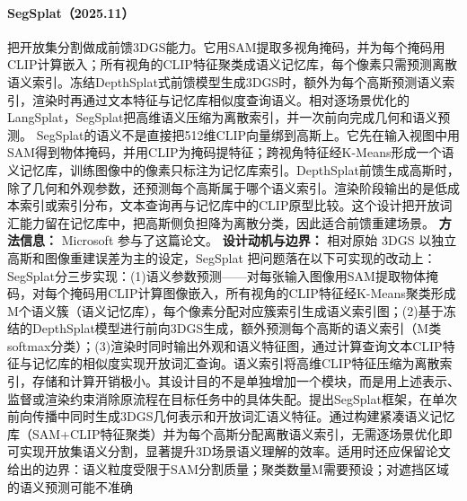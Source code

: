 \paragraph{SegSplat（2025.11）\cite{2511_18386}}
把开放集分割做成前馈3DGS能力。它用SAM提取多视角掩码，并为每个掩码用CLIP计算嵌入；所有视角的CLIP特征聚类成语义记忆库，每个像素只需预测离散语义索引。冻结DepthSplat式前馈模型生成3DGS时，额外为每个高斯预测语义索引，渲染时再通过文本特征与记忆库相似度查询语义。相对逐场景优化的LangSplat，SegSplat把高维语义压缩为离散索引，并一次前向完成几何和语义预测。
SegSplat的语义不是直接把512维CLIP向量绑到高斯上。它先在输入视图中用SAM得到物体掩码，并用CLIP为掩码提特征；跨视角特征经K-Means形成一个语义记忆库，训练图像中的像素只标注为记忆库索引。DepthSplat前馈生成高斯时，除了几何和外观参数，还预测每个高斯属于哪个语义索引。渲染阶段输出的是低成本索引或索引分布，文本查询再与记忆库中的CLIP原型比较。这个设计把开放词汇能力留在记忆库中，把高斯侧负担降为离散分类，因此适合前馈重建场景。
\textbf{方法信息：} Microsoft 参与了这篇论文。
\textbf{设计动机与边界：} 相对原始 3DGS 以独立高斯和图像重建误差为主的设定，SegSplat 把问题落在以下可实现的改动上：SegSplat分三步实现：(1)语义参数预测——对每张输入图像用SAM提取物体掩码，对每个掩码用CLIP计算图像嵌入，所有视角的CLIP特征经K-Means聚类形成M个语义簇（语义记忆库），每个像素分配对应簇索引生成语义索引图；(2)基于冻结的DepthSplat模型进行前向3DGS生成，额外预测每个高斯的语义索引（M类softmax分类）；(3)渲染时同时输出外观和语义特征图，通过计算查询文本CLIP特征与记忆库的相似度实现开放词汇查询。语义索引将高维CLIP特征压缩为离散索引，存储和计算开销极小。其设计目的不是单独增加一个模块，而是用上述表示、监督或渲染约束消除原流程在目标任务中的具体失配。提出SegSplat框架，在单次前向传播中同时生成3DGS几何表示和开放词汇语义特征。通过构建紧凑语义记忆库（SAM+CLIP特征聚类）并为每个高斯分配离散语义索引，无需逐场景优化即可实现开放集语义分割，显著提升3D场景语义理解的效率。适用时还应保留论文给出的边界：语义粒度受限于SAM分割质量；聚类数量M需要预设；对遮挡区域的语义预测可能不准确
